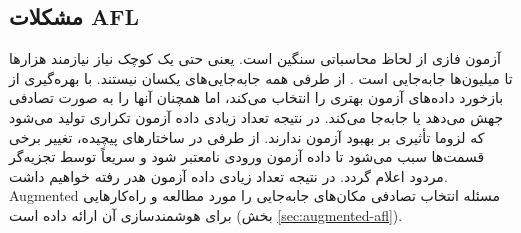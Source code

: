  
 \begin{algorithm}[ht]%
 	\onehalfspacing
 	\caption[]{ \cite{DBLP:journals/corr/abs-1711-04596}} \label{alg:afl_fuzz}
 	
 	\begin{latin}
 		\DontPrintSemicolon
 		\setcounter{AlgoLine}{0}
 		\LinesNumbered
 		
 		
 		
 		
 		{
 		}
 		
 	\end{latin}
 	
 \end{algorithm} 


\subsection{مشکلات AFL}
آزمون فازی از لحاظ محاسباتی سنگین است. یعنی حتی یک  کوچک نیاز نیازمند هزارها تا میلیون‌ها جابه‌جایی است \cite{DBLP:journals/corr/abs-1711-04596}. از طرفی همه جابه‌جایی‌های یکسان نیستند.  با بهره‌گیری از بازخورد داده‌های آزمون بهتری را انتخاب می‌کند، اما همچنان آنها را به صورت تصادفی جهش می‌دهد یا جابه‌جا می‌کند. در نتیجه تعداد زیادی داده آزمون تکراری تولید می‌شود که لزوما تأثیری بر بهبود آزمون ندارند. از طرفی در ساختارهای پیچیده، تغییر برخی قسمت‌ها سبب می‌شود تا داده آزمون ورودی نامعتبر شود و سریعاً توسط تجزیه‌گر مردود اعلام گردد. در نتیجه تعداد زیادی داده آزمون هدر رفته خواهیم داشت. \gls{Augmented}
\cite{DBLP:journals/corr/abs-1711-04596}
مسئله انتخاب تصادفی مکان‌های جابه‌جایی را مورد مطالعه و راه‌کارهایی برای هوشمندسازی آن ارائه داده است (بخش \ref{sec:augmented-afl}). 



